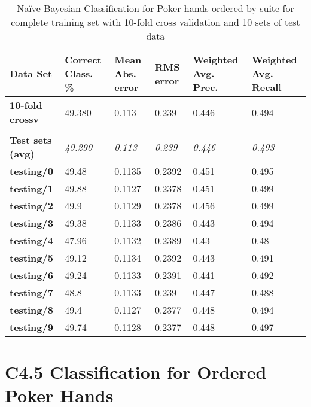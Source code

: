 \documentclass[10pt, a4paper]{article}
\begin{document}
\begin{table}[htbp]
  \centering
  \begin{tabular}{p{3cm}p{1.5cm}p{1.5cm}p{1.5cm}p{1.5cm}p{1.5cm}}
    \toprule
    \textbf{Data Set} & Correct Class. \% & Mean Abs. error & RMS error & Weighted Avg. Prec. & Weighted Avg. Recall \\
    \midrule
    \textbf{10-fold crossv} & 49.380 & 0.113 & 0.239 & 0.446 & 0.494 \\
    \textbf{} &       &       &       &       &  \\
    \textbf{Test sets (avg)} & \textit{49.290} & \textit{0.113} & \textit{0.239} & \textit{0.446} & \textit{0.493} \\
    \textbf{   testing/0} & 49.48 & 0.1135 & 0.2392 & 0.451 & 0.495 \\
    \textbf{   testing/1} & 49.88 & 0.1127 & 0.2378 & 0.451 & 0.499 \\
    \textbf{   testing/2} & 49.9  & 0.1129 & 0.2378 & 0.456 & 0.499 \\
    \textbf{   testing/3} & 49.38 & 0.1133 & 0.2386 & 0.443 & 0.494 \\
    \textbf{   testing/4} & 47.96 & 0.1132 & 0.2389 & 0.43  & 0.48 \\
    \textbf{   testing/5} & 49.12 & 0.1134 & 0.2392 & 0.443 & 0.491 \\
    \textbf{   testing/6} & 49.24 & 0.1133 & 0.2391 & 0.441 & 0.492 \\
    \textbf{   testing/7} & 48.8  & 0.1133 & 0.239 & 0.447 & 0.488 \\
    \textbf{   testing/8} & 49.4  & 0.1127 & 0.2377 & 0.448 & 0.494 \\
    \textbf{   testing/9} & 49.74 & 0.1128 & 0.2377 & 0.448 & 0.497 \\
    \bottomrule
    \end{tabular}%

	\caption{Na\"ive Bayesian Classification for Poker hands ordered by suite for complete training set with 10-fold cross validation and 10 sets of test data}   
  \label{tab:nbosresults}%
\end{table}%


\clearpage

\section{C4.5 Classification for Ordered Poker Hands}
\label{app:c45}
\end{document}
